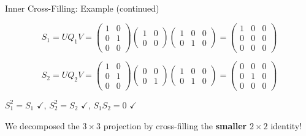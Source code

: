\documentclass[10pt]{beamer}
\theoremstyle{definition}
\newcommand{\x}[1]{\alert{\textbf{#1}}}
\begin{document}
\begin{frame}{Inner Cross-Filling: Example (continued)}

$$S_1 = UQ_1V = \begin{pmatrix} 1 & 0 \\ 0 & 1 \\ 0 & 0 \end{pmatrix}\begin{pmatrix} 1 & 0 \\ 0 & 0 \end{pmatrix}\begin{pmatrix} 1 & 0 & 0 \\ 0 & 1 & 0 \end{pmatrix} = \begin{pmatrix} 1 & 0 & 0 \\ 0 & 0 & 0 \\ 0 & 0 & 0 \end{pmatrix}$$

\vspace{0.3em}

$$S_2 = UQ_2V = \begin{pmatrix} 1 & 0 \\ 0 & 1 \\ 0 & 0 \end{pmatrix}\begin{pmatrix} 0 & 0 \\ 0 & 1 \end{pmatrix}\begin{pmatrix} 1 & 0 & 0 \\ 0 & 1 & 0 \end{pmatrix} = \begin{pmatrix} 0 & 0 & 0 \\ 0 & 1 & 0 \\ 0 & 0 & 0 \end{pmatrix}$$

\vspace{0.5em}

$S_1^2 = S_1$ $\checkmark$, \; $S_2^2 = S_2$ $\checkmark$, \; $S_1 S_2 = 0$ $\checkmark$

\vspace{0.3em}

We decomposed the $3 \times 3$ projection by cross-filling the \x{smaller} $2 \times 2$ identity!

\end{frame}
\end{document}

